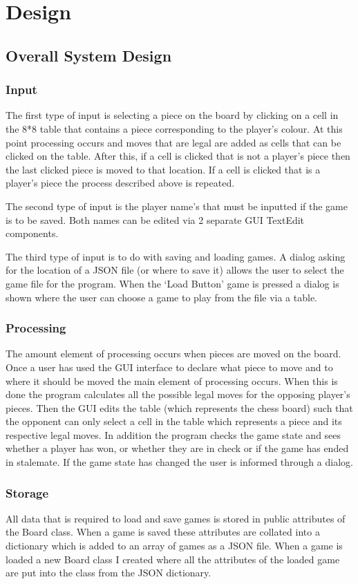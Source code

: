 \documentclass[]{report}
\begin{document}
\chapter{Design}
\section{Overall System Design}
\subsection{Input}
The first type of input is selecting a piece on the board by clicking on a cell in the 8*8 table that contains a piece corresponding to the player's colour. At this point processing occurs and moves that are legal are added as cells that can be clicked on the table. After this, if a cell is clicked that is not a player's piece then the last clicked piece is moved to that location. If a cell is clicked that is a player's piece the process described above is repeated.

The second type of input is the player name's that must be inputted if the game is to be saved. Both names can be edited via 2 separate GUI TextEdit components. 

The third type of input is to do with saving and loading games. A dialog asking for the location of a JSON file (or where to save it) allows the user to select the game file for the program. When the ‘Load Button' game is pressed a dialog is shown where the user can choose a game to play from the file via a table.
\subsection{Processing}
The amount element of processing occurs when pieces are moved on the board. Once a user has used the GUI interface to declare what piece to move and to where it should be moved the main element of processing occurs. When this is done the program calculates all the possible legal moves for the opposing player's pieces. Then the GUI edits the table (which represents the chess board) such that the opponent can only select a cell in the table which represents a piece and its respective legal moves. In addition the program checks the game state and sees whether a player has won, or whether they are in check or if the game has ended in stalemate. If the game state has changed the user is informed through a dialog. 
\subsection{Storage}
All data that is required to load and save games is stored in public attributes of the Board class. When a game is saved these attributes are collated into a dictionary which is added to an array of games as a JSON file. When a game is loaded a new Board class I created where all the attributes of the loaded game are put into the class from the JSON dictionary.
\end{document}
